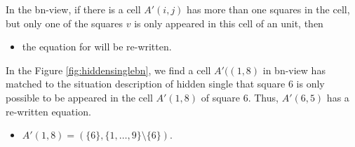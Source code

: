 \documentclass[11pt]{report}
\newcommand{\set}[1]{\{ #1 \}}
\begin{document}
In the bn-view, if there is a cell $A'(i,j)$ has more than one squares in the cell, but only one of the squares $v$ is only appeared in this cell of an unit, then
\begin{itemize}
\item the equation for will be re-written.
\end{itemize}
In the Figure \ref{fig:hiddensinglebn}, we find a cell $A'((1, 8)$ in bn-view has matched to the situation description of hidden single that square $6$ is only possible to be appeared in the cell $A'(1, 8)$ of square $6$. Thus, $A'(6,5)$ has a re-written equation.
\begin{itemize}
\item $A'(1,8) = (\set{6}, \set{1,\dots,9} \setminus \set{6})$.
\end{itemize}
\end{document}
